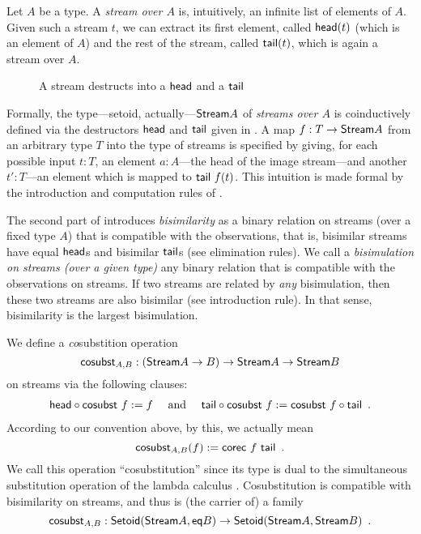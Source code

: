 \documentclass[a4paper,USenglish]{lipics}
\begin{document}
\begin{ex}
 \label{ex_stream}
  Let $A$ be a type. A \emph{stream over $A$} is, intuitively, an infinite list of elements of $A$. 
  Given such a stream $t$, we can extract its first element, called $\mathsf{head}(t)$ (which is an element of $A$) and the rest of the stream, called $\mathsf{tail}(t)$, which is again a stream over $A$.
  \begin{figure}[htb]
   \caption{A stream destructs into a $\mathsf{head}$ and a $\mathsf{tail}$} \label{fig:stream}
  \end{figure}
  Formally, the type---setoid, actually---$\mathsf{Stream} A$ of \emph{streams over $A$} is coinductively defined via the destructors $\mathsf{head}$ and $\mathsf{tail}$
  given in .  A map $f:T\to \mathsf{Stream} A$ from an arbitrary type $T$ into the type of streams is specified by giving, for each possible input $t:T$, 
  an element $a:A$---the head of the image stream---and another $t':T$---an element which is mapped to $\mathsf{tail}~f(t)$. This intuition is made formal by the 
  introduction and computation rules of .
  
  The second part of  introduces \emph{bisimilarity} as a binary relation on streams (over a fixed type $A$) that is compatible with the observations,
  that is, bisimilar streams have equal $\mathsf{head}$s and bisimilar $\mathsf{tail}$s (see elimination rules). 
  We call a \emph{bisimulation on streams (over a given type)} any binary relation that is compatible with the observations on streams.
  If two streams are related by \emph{any} bisimulation,
  then these two streams are also bisimilar (see introduction rule). In that sense, bisimilarity is the largest bisimulation.
  
  We define a \emph{co}substition operation 
   \[\mathsf{cosubst}_{A,B} : (\mathsf{Stream} A \to B) \to \mathsf{Stream} A\to\mathsf{Stream} B\] 
   on streams via the following clauses:
% 
   \begin{align} {\ensuremath{\mathsf{head}}} \circ {\ensuremath{\mathsf{cosubst}}~f} := f \quad\text{ and } \quad
                  {\ensuremath{\mathsf{tail}}} \circ {\ensuremath{\mathsf{cosubst}}~f} := {\mathsf{cosubst}~f} \circ {\ensuremath{\mathsf{tail}}} \enspace . \label{eq:tail_sredec}
    \end{align}
  According to our convention above, by this, we actually mean
  \[  \mathsf{cosubst}_{A,B}(f) := \mathsf{corec}~f~\mathsf{tail} \enspace . \]
  We call this operation \enquote{cosubstitution} since its type is dual to the simultaneous substitution operation 
  of the lambda calculus \parencite{alt_reus}. 
  Cosubstitution is compatible with bisimilarity on streams, and thus is (the carrier of) a family
  \[ \mathsf{cosubst}_{A,B} : \mathsf{Setoid}(\mathsf{Stream} A, \mathsf{eq} B) \to \mathsf{Setoid}(\mathsf{Stream} A,\mathsf{Stream} B) \enspace . \]


\end{ex}
\end{document}
